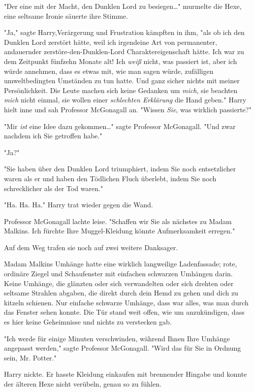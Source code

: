 {"Der eine mit der Macht, den Dunklen Lord zu besiegen…" murmelte die Hexe, eine seltsame Ironie säuerte ihre Stimme.

"Ja," sagte Harry,Verärgerung und Frustration kämpften in ihm, "als ob ich den Dunklen Lord zerstört hätte, weil ich irgendeine Art von permanenter, andauernder zerstöre-den-Dunklen-Lord Charaktereigenschaft hätte. Ich war zu dem Zeitpunkt fünfzehn Monate alt! Ich \emph{weiß} nicht, was passiert ist, aber ich würde annehmen, dass es etwas mit, wie man sagen würde, zufälligen umweltbedingten Umständen zu tun hatte. Und ganz sicher nichts mit meiner Persönlichkeit. Die Leute machen sich keine Gedanken um \emph{mich}, sie beachten \emph{mich} nicht einmal, sie wollen einer \emph{schlechten Erklärung} die Hand geben." Harry hielt inne und sah Professor McGonagall an. "Wissen \emph{Sie}, was wirklich passierte?"

"Mir \emph{ist} eine Idee dazu gekommen…" sagte Professor McGonagall. "Und zwar nachdem ich Sie getroffen habe."

"Ja?"

"Sie haben über den Dunklen Lord triumphiert, indem Sie noch entsetzlicher waren als er und haben den Tödlichen Fluch überlebt, indem Sie noch schrecklicher als der Tod waren."

"Ha. Ha. Ha." Harry trat wieder gegen die Wand.

Professor McGonagall lachte leise. "Schaffen wir Sie als nächstes zu Madam Malkins. Ich fürchte Ihre Muggel-Kleidung könnte Aufmerksamkeit erregen."

Auf dem Weg trafen sie noch auf zwei weitere Danksager.

Madam Malkins Umhänge hatte eine wirklich langweilige Ladenfassade; rote, ordinäre Ziegel und Schaufenster mit einfachen schwarzen Umhängen darin. Keine Umhänge, die glänzten oder sich verwandelten oder sich drehten oder seltsame Strahlen abgaben, die direkt durch dein Hemd zu gehen und dich zu kitzeln schienen. Nur einfache schwarze Umhänge, dass war alles, was man durch das Fenster sehen konnte. Die Tür stand weit offen, wie um anzukündigen, dass es hier keine Geheimnisse und nichts zu verstecken gab.

"Ich werde für einige Minuten verschwinden, während Ihnen Ihre Umhänge angepasst werden," sagte Professor McGonagall. "Wird das für Sie in Ordnung sein, Mr. Potter."

Harry nickte. Er hasste Kleidung einkaufen mit brennender Hingabe und konnte der älteren Hexe nicht verübeln, genau so zu fühlen.

}
